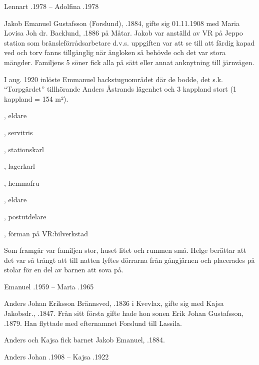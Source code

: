 Lennart .1978  --  Adolfina .1978


Jakob Emanuel Gustafsson (Forslund), .1884, gifte sig 01.11.1908 med Maria Lovisa Joh dr. Backlund,  .1886 på Måtar. Jakob var anställd av VR på Jeppo station som bränsleförrådsarbetare d.v.s. uppgiften var att se till att färdig kapad ved och torv fanns tillgänglig när ångloken så behövde och det var stora mängder.  Familjens 5 söner fick alla på sätt eller annat anknytning till järnvägen.

I aug. 1920 inlöste Emmanuel backstuguområdet där de bodde, det s.k. ``Torpgärdet'' tillhörande Anders Åstrands lägenhet och 3 kappland stort (1 kappland = 154 m²).
\begin{jhchildren}
  \item {}, eldare
  \item {}
  \item {}, servitris
  \item {}, stationskarl
  \item {}, lagerkarl
  \item {}, hemmafru
  \item {}, eldare
  \item {}, postutdelare
  \item {}, förman på VR:bilverkstad
\end{jhchildren}
Som framgår var familjen stor, huset litet och rummen små. Helge berättar att det var så trångt att till natten lyftes dörrarna från gångjärnen och placerades på stolar för en del av barnen att  sova på.

Emanuel .1959  --  Maria .1965


Anders Johan Eriksson Brännsved, .1836 i Kvevlax, gifte sig med Kajsa Jakobsdr., .1847. Från sitt första gifte hade hon sonen Erik Johan Gustafsson, .1879. Han flyttade med efternamnet  Forslund till Lassila.

Anders och Kajsa fick barnet Jakob Emanuel, .1884.

Anders Johan .1908  --  Kajsa .1922



